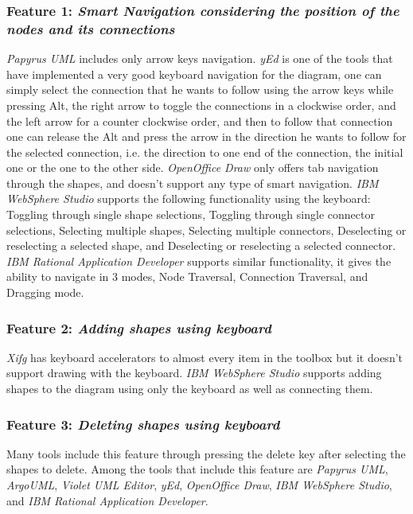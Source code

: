 \subsubsection {Feature 1: {\em Smart Navigation considering the position of the nodes and its connections}} 
{\em Papyrus UML} includes only arrow keys navigation. {\em yEd} is one of the tools that have implemented a very good keyboard navigation for the diagram, one can simply select the connection that he wants to follow using the arrow keys while pressing Alt, the right arrow to toggle the connections in a clockwise order, and the left arrow for a counter clockwise order, and then to follow that connection one can release the Alt and press the arrow in the direction he wants to follow for the selected connection, i.e. the direction to one end of the connection, the initial one or the one to the other side. {\em OpenOffice Draw} only offers tab navigation through the shapes, and doesn't support any type of smart navigation. {\em IBM WebSphere Studio} supports the following functionality using the keyboard: Toggling through single shape selections, Toggling through single connector selections, Selecting multiple shapes, Selecting multiple connectors, Deselecting or reselecting a selected shape, and Deselecting or reselecting a selected connector. {\em IBM Rational Application Developer} supports similar functionality, it gives the ability to navigate in 3 modes, Node Traversal, Connection Traversal, and Dragging mode.

\subsubsection {Feature 2: {\em Adding shapes using keyboard}} 
{\em Xifg} has keyboard accelerators to almost every item in the toolbox but it doesn't support drawing with the keyboard. {\em IBM WebSphere Studio} supports adding shapes to the diagram using only the keyboard as well as connecting them.

\subsubsection {Feature 3: {\em Deleting shapes using keyboard}} 
Many tools include this feature through pressing the delete key after selecting the shapes to delete. Among the tools that include this feature are {\em Papyrus UML}, {\em ArgoUML}, {\em Violet UML Editor}, {\em yEd}, {\em OpenOffice Draw}, {\em IBM WebSphere Studio}, and {\em IBM Rational Application Developer}.

